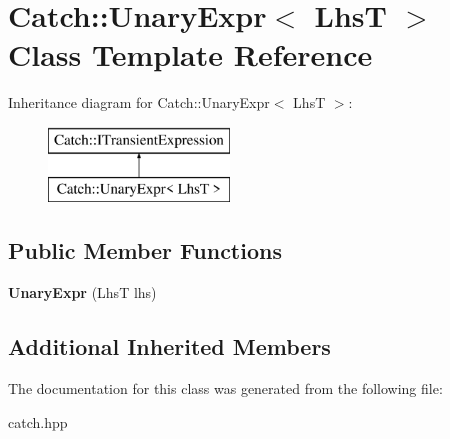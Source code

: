 \hypertarget{classCatch_1_1UnaryExpr}{}\section{Catch\+::Unary\+Expr$<$ LhsT $>$ Class Template Reference}
\label{classCatch_1_1UnaryExpr}
Inheritance diagram for Catch\+::Unary\+Expr$<$ LhsT $>$\+:\begin{figure}[H]
\begin{center}
\leavevmode
\includegraphics[height=2.000000cm]{classCatch_1_1UnaryExpr}
\end{center}
\end{figure}
\subsection*{Public Member Functions}
\begin{DoxyCompactItemize}
\item 
\mbox{\label{classCatch_1_1UnaryExpr_ae02f666a1e64da728628aa2033e1d6e7}} 
{\bfseries Unary\+Expr} (LhsT lhs)
\end{DoxyCompactItemize}
\subsection*{Additional Inherited Members}


The documentation for this class was generated from the following file\+:\begin{DoxyCompactItemize}
\item 
catch.\+hpp\end{DoxyCompactItemize}
